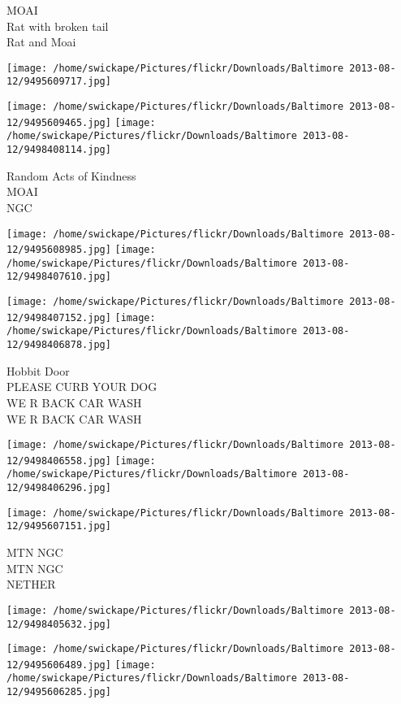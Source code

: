 \documentclass[10pt,letterpaper]{article}
\begin{document}
MOAI\\
Rat with broken tail\\
Rat and Moai\\
\pagebreak

\texttt{[image: /home/swickape/Pictures/flickr/Downloads/Baltimore 2013-08-12/9495609717.jpg]}

\vspace{0.25in}
\texttt{[image: /home/swickape/Pictures/flickr/Downloads/Baltimore 2013-08-12/9495609465.jpg]}
\texttt{[image: /home/swickape/Pictures/flickr/Downloads/Baltimore 2013-08-12/9498408114.jpg]}

Random Acts of Kindness\\
MOAI\\
NGC\\
\pagebreak

\texttt{[image: /home/swickape/Pictures/flickr/Downloads/Baltimore 2013-08-12/9495608985.jpg]}
\texttt{[image: /home/swickape/Pictures/flickr/Downloads/Baltimore 2013-08-12/9498407610.jpg]}

\texttt{[image: /home/swickape/Pictures/flickr/Downloads/Baltimore 2013-08-12/9498407152.jpg]}
\texttt{[image: /home/swickape/Pictures/flickr/Downloads/Baltimore 2013-08-12/9498406878.jpg]}

Hobbit Door\\
PLEASE CURB YOUR DOG\\
WE R BACK CAR WASH\\
WE R BACK CAR WASH\\
\pagebreak

\texttt{[image: /home/swickape/Pictures/flickr/Downloads/Baltimore 2013-08-12/9498406558.jpg]}
\texttt{[image: /home/swickape/Pictures/flickr/Downloads/Baltimore 2013-08-12/9498406296.jpg]}

\texttt{[image: /home/swickape/Pictures/flickr/Downloads/Baltimore 2013-08-12/9495607151.jpg]}

MTN NGC\\
MTN NGC\\
NETHER\\
\pagebreak

\texttt{[image: /home/swickape/Pictures/flickr/Downloads/Baltimore 2013-08-12/9498405632.jpg]}

\vspace{0.25in}
\texttt{[image: /home/swickape/Pictures/flickr/Downloads/Baltimore 2013-08-12/9495606489.jpg]}
\texttt{[image: /home/swickape/Pictures/flickr/Downloads/Baltimore 2013-08-12/9495606285.jpg]}
\end{document}
